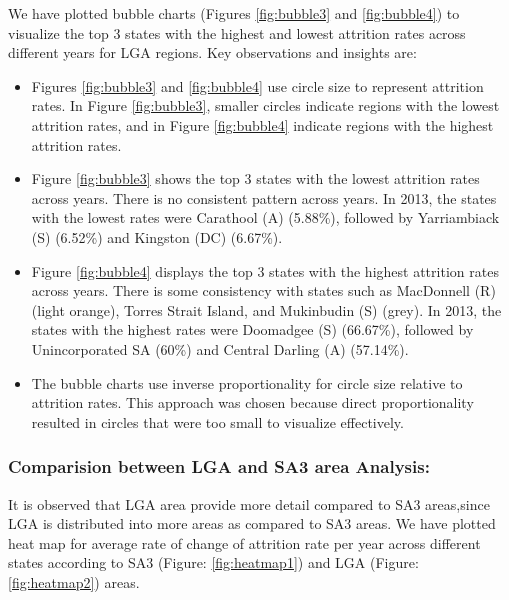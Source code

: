 \documentclass[conference]{IEEEtran}
\begin{document}
We have plotted bubble charts (Figures \ref{fig:bubble3} and \ref{fig:bubble4}) to visualize the top 3 states with the highest and lowest attrition rates across different years for LGA regions. Key observations and insights are:
\begin{itemize} 
    \item Figures \ref{fig:bubble3} and \ref{fig:bubble4} use circle size to represent attrition rates. In Figure \ref{fig:bubble3}, smaller circles indicate regions with the lowest attrition rates, and in Figure \ref{fig:bubble4} indicate regions with the highest attrition rates. 
    \item Figure \ref{fig:bubble3} shows the top 3 states with the lowest attrition rates across years. There is no consistent pattern across years. In 2013, the states with the lowest rates were Carathool (A) (5.88\%), followed by Yarriambiack (S) (6.52\%) and Kingston (DC) (6.67\%). 
    \item Figure \ref{fig:bubble4} displays the top 3 states with the highest attrition rates across years. There is some consistency with states such as MacDonnell (R) (light orange), Torres Strait Island, and Mukinbudin (S) (grey). In 2013, the states with the highest rates were Doomadgee (S) (66.67\%), followed by Unincorporated SA (60\%) and Central Darling (A) (57.14\%). 
    \item The bubble charts use inverse proportionality for circle size relative to attrition rates. This approach was chosen because direct proportionality resulted in circles that were too small to visualize effectively. 
\end{itemize}
\vspace{10pt}
\subsubsection{Comparision between LGA and SA3 area Analysis:} It is observed that LGA area provide more detail compared to SA3 areas,since LGA is distributed into more areas as compared to SA3 areas.
We have plotted heat map for average rate of change of attrition rate per year across different states according to SA3 (Figure: \ref{fig:heatmap1}) and LGA (Figure: \ref{fig:heatmap2}) areas.
\end{document}
